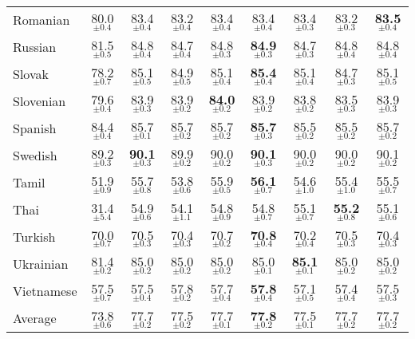 \begin{table*}[ht]
{{\begin{tabular}{lcccccccc}
Romanian & 80.0$_{\pm 0.4}$ & 83.4$_{\pm 0.4}$ & 83.2$_{\pm 0.4}$ & 83.4$_{\pm 0.4}$ & 83.4$_{\pm 0.4}$ & 83.4$_{\pm 0.3}$ & 83.2$_{\pm 0.3}$ & \textbf{83.5}$_{\pm 0.4}$ \\
Russian & 81.5$_{\pm 0.5}$ & 84.8$_{\pm 0.4}$ & 84.7$_{\pm 0.4}$ & 84.8$_{\pm 0.3}$ & \textbf{84.9}$_{\pm 0.3}$ & 84.7$_{\pm 0.3}$ & 84.8$_{\pm 0.4}$ & 84.8$_{\pm 0.4}$ \\
Slovak & 78.2$_{\pm 0.7}$ & 85.1$_{\pm 0.5}$ & 84.9$_{\pm 0.5}$ & 85.1$_{\pm 0.4}$ & \textbf{85.4}$_{\pm 0.4}$ & 85.1$_{\pm 0.4}$ & 84.7$_{\pm 0.3}$ & 85.1$_{\pm 0.5}$ \\
Slovenian & 79.6$_{\pm 0.4}$ & 83.9$_{\pm 0.3}$ & 83.9$_{\pm 0.2}$ & \textbf{84.0}$_{\pm 0.2}$ & 83.9$_{\pm 0.2}$ & 83.8$_{\pm 0.2}$ & 83.5$_{\pm 0.3}$ & 83.9$_{\pm 0.3}$ \\
Spanish & 84.4$_{\pm 0.4}$ & 85.7$_{\pm 0.1}$ & 85.7$_{\pm 0.2}$ & 85.7$_{\pm 0.2}$ & \textbf{85.7}$_{\pm 0.3}$ & 85.5$_{\pm 0.2}$ & 85.5$_{\pm 0.2}$ & 85.7$_{\pm 0.2}$ \\
Swedish & 89.2$_{\pm 0.3}$ & \textbf{90.1}$_{\pm 0.3}$ & 89.9$_{\pm 0.2}$ & 90.0$_{\pm 0.2}$ & \textbf{90.1}$_{\pm 0.3}$ & 90.0$_{\pm 0.2}$ & 90.0$_{\pm 0.2}$ & 90.1$_{\pm 0.2}$ \\
Tamil & 51.9$_{\pm 0.9}$ & 55.7$_{\pm 0.8}$ & 53.8$_{\pm 0.6}$ & 55.9$_{\pm 0.5}$ & \textbf{56.1}$_{\pm 0.7}$ & 54.6$_{\pm 1.0}$ & 55.4$_{\pm 1.0}$ & 55.5$_{\pm 0.7}$ \\
Thai & 31.4$_{\pm 5.4}$ & 54.9$_{\pm 0.6}$ & 54.1$_{\pm 1.1}$ & 54.8$_{\pm 0.9}$ & 54.8$_{\pm 0.7}$ & 55.1$_{\pm 0.7}$ & \textbf{55.2}$_{\pm 0.8}$ & 55.1$_{\pm 0.6}$ \\
Turkish & 70.0$_{\pm 0.7}$ & 70.5$_{\pm 0.3}$ & 70.4$_{\pm 0.3}$ & 70.7$_{\pm 0.2}$ & \textbf{70.8}$_{\pm 0.4}$ & 70.2$_{\pm 0.4}$ & 70.5$_{\pm 0.3}$ & 70.4$_{\pm 0.3}$ \\
Ukrainian & 81.4$_{\pm 0.2}$ & 85.0$_{\pm 0.2}$ & 85.0$_{\pm 0.2}$ & 85.0$_{\pm 0.2}$ & 85.0$_{\pm 0.1}$ & \textbf{85.1}$_{\pm 0.1}$ & 85.0$_{\pm 0.2}$ & 85.0$_{\pm 0.2}$ \\
Vietnamese & 57.5$_{\pm 0.7}$ & 57.5$_{\pm 0.4}$ & 57.8$_{\pm 0.2}$ & 57.7$_{\pm 0.4}$ & \textbf{57.8}$_{\pm 0.4}$ & 57.1$_{\pm 0.5}$ & 57.4$_{\pm 0.4}$ & 57.5$_{\pm 0.3}$ \\
\hline
Average & 73.8$_{\pm 0.6}$ & 77.7$_{\pm 0.2}$ & 77.5$_{\pm 0.2}$ & 77.7$_{\pm 0.1}$ & \textbf{77.8}$_{\pm 0.2}$ & 77.5$_{\pm 0.1}$ & 77.7$_{\pm 0.2}$ & 77.7$_{\pm 0.2}$ \\
        \hline
        \end{tabular}
        }
        }
        \caption{}
        \label{table:results_mBERT_PoS-single_layer_freezing}
        \end{table*}